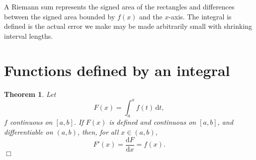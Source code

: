 \documentclass[letter-paper]{tufte-book}
\newtheorem{theorem}{\color{pastel-blue}Theorem}[section]
\newcommand{\qedwhite}{\hfill \ensuremath{\Box}}
\begin{document}
A Riemann sum represents the signed area of the rectangles and differences
between the signed area bounded by $f(x)$ and the $x$-axis. The integral is
defined is the actual error we make may be made arbitrarily small with shrinking
interval lengths.


\section{Functions defined by an integral}

\begin{theorem}
  Let
  \begin{equation*}
    F(x)=\int_a^x f(t)\, \mathrm{d}t,
  \end{equation*}
  $f$ continuous on $[a,b]$. If $F(x)$ is defined and continuous on $[a,b]$, and
  differentiable on $(a,b)$, then, for all $x\in(a,b)$,
  \begin{equation*}
    F'(x)=\frac{\mathrm{d}F}{\mathrm{d}x}=f(x).
  \end{equation*}
  \qedwhite
\end{theorem}
\end{document}
